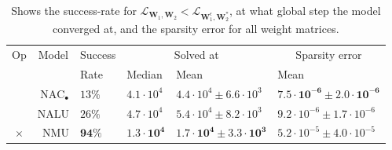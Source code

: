 \begin{table}[!h]

\caption{\label{tab:very-simple-function-results}Shows the success-rate for $\mathcal{L}_{\mathbf{W}_1, \mathbf{W}_2} < \mathcal{L}_{\mathbf{W}_1^\epsilon, \mathbf{W}_2^*}$, at what global step the model converged at, and the sparsity error for all weight matrices.}
\centering
\begin{tabular}{crllll}
\toprule
\multicolumn{1}{c}{Op} & \multicolumn{1}{c}{Model} & \multicolumn{1}{c}{Success} & \multicolumn{2}{c}{Solved at} & \multicolumn{1}{c}{Sparsity error} \\
\cmidrule(l{3pt}r{3pt}){1-1} \cmidrule(l{3pt}r{3pt}){2-2} \cmidrule(l{3pt}r{3pt}){3-3} \cmidrule(l{3pt}r{3pt}){4-5} \cmidrule(l{3pt}r{3pt}){6-6}
 &  & Rate & Median & Mean & Mean\\
\midrule
 & ${\mathrm{NAC}_\bullet}$ & $13\%$ & $4.1 \cdot 10^{4}$ & $4.4 \cdot 10^{4} \pm 6.6 \cdot 10^{3}$ & $\mathbf{7.5 \cdot 10^{-6} \pm 2.0 \cdot 10^{-6}}$\\

 & NALU & $26\%$ & $4.7 \cdot 10^{4}$ & $5.4 \cdot 10^{4} \pm 8.2 \cdot 10^{3}$ & $9.2 \cdot 10^{-6} \pm 1.7 \cdot 10^{-6}$\\

\multirow{-3}{*}{\centering\arraybackslash $\bm{\times}$} & NMU & $\mathbf{94\%}$ & $\mathbf{1.3 \cdot 10^{4}}$ & $\mathbf{1.7 \cdot 10^{4} \pm 3.3 \cdot 10^{3}}$ & $5.2 \cdot 10^{-5} \pm 4.0 \cdot 10^{-5}$\\
\bottomrule
\end{tabular}
\end{table}
